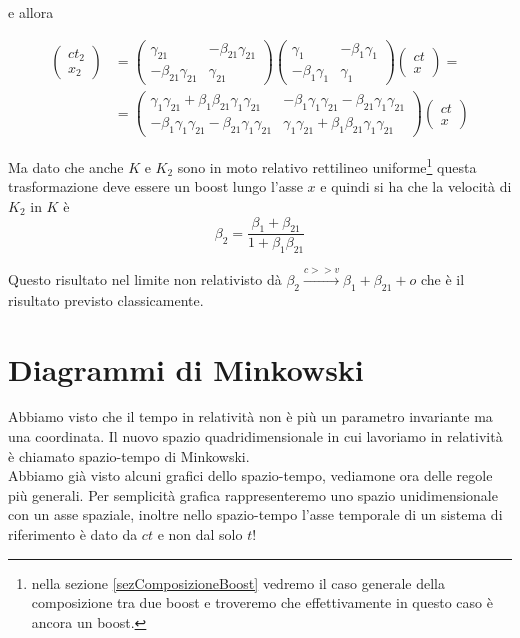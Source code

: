 \documentclass[12pt,a4paper,titlepage, twoside, openright]{book}
\numberwithin{equation}{chapter}
\begin{document}
e allora 

\begin{align*}
\left(\begin{array}{c}
ct_2 \\ x_2 \end{array}\right) &=\left(\begin{array}{cc}
\gamma_{21} & -\beta_{21}\gamma_{21} \\
-\beta_{21}\gamma_{21} & \gamma_{21} \end{array}\right)\left(\begin{array}{cc}
\gamma_1 & -\beta_1\gamma_1 \\
-\beta_1\gamma_1  & \gamma_1 \end{array}\right)\left(\begin{array}{c} ct \\ x \end{array}\right) = \\
&=\left(\begin{array}{cc}
\gamma_1\gamma_{21}+\beta_1\beta_{21}\gamma_1\gamma_{21} & -\beta_1\gamma_1\gamma_{21}-\beta_{21}\gamma_1\gamma_{21} \\
-\beta_1\gamma_1\gamma_{21}-\beta_{21}\gamma_1\gamma_{21} & \gamma_1\gamma_{21}+\beta_1\beta_{21}\gamma_1\gamma_{21} \end{array}\right)\left(\begin{array}{c} ct \\ x \end{array}\right) 
\end{align*}

Ma dato che anche $K$ e $K_2$ sono in moto relativo rettilineo uniforme\footnote{nella sezione \ref{sezComposizioneBoost} vedremo il caso generale della composizione tra due boost e troveremo che effettivamente in questo caso è ancora un boost.} questa trasformazione deve essere un boost lungo l'asse $x$ e quindi si ha che la velocità di $K_2$ in $K$ è
\begin{equation}
\beta_2=\dfrac{\beta_1+\beta_{21}}{1+\beta_1\beta_{21}}
\end{equation}

Questo risultato nel limite non relativisto dà $\beta_2\overset{c>>v}{\longrightarrow} \beta_1+\beta_{21} +o$ che è il risultato previsto classicamente.

\section{Diagrammi di Minkowski}
Abbiamo visto che il tempo in relatività non è più un parametro invariante ma una coordinata. 
Il nuovo spazio quadridimensionale in cui lavoriamo in relatività è chiamato spazio-tempo di Minkowski. \\
Abbiamo già visto alcuni grafici dello spazio-tempo, vediamone ora delle regole più generali.
Per semplicità grafica rappresenteremo uno spazio unidimensionale con un asse spaziale, inoltre nello spazio-tempo l'asse temporale di un sistema di riferimento è dato da $ct$ e non dal solo $t$!
\end{document}
